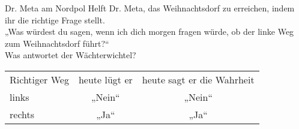 \begin{frame}{Dr. Meta am Nordpol\textsuperscript{\thefootnote}}
		Helft Dr. Meta, das Weihnachtsdorf zu erreichen, indem ihr die richtige Frage stellt. %
	\\[1em]
	\Impl „Was würdest du sagen, wenn ich dich morgen fragen würde, ob der linke Weg zum Weihnachtsdorf führt?“\\
	\bigskip
	Was antwortet der Wächterwichtel? \\
	\smallskip
	\begin{tabular}{|l|c|c|}
		\hline
		Richtiger Weg & heute lügt er & heute sagt er die Wahrheit \\
		\hhline{|=|=|=|}
		links & „Nein“ & „Nein“ \\
		\hline
		rechts & „Ja“ & „Ja“ \\
		\hline
	\end{tabular}
	
\end{frame}